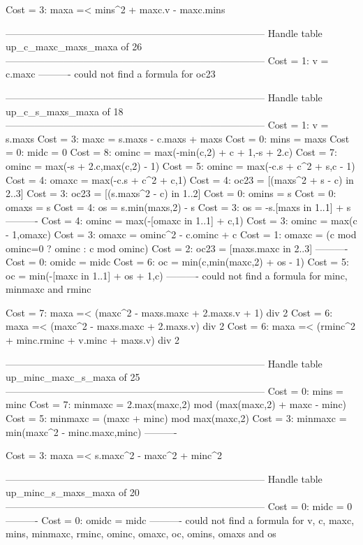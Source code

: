 Cost =  3:  maxa =< mins^2 + maxc.v - maxc.mins

--------------------------------------------------------------------------------
Handle table up_c_maxc_maxs_maxa of 26
--------------------------------------------------------------------------------
Cost =  1:  v    = c.maxc
----------
could not find a formula for oc23


--------------------------------------------------------------------------------
Handle table up_c_s_maxs_maxa of 18
--------------------------------------------------------------------------------
Cost =  1:  v       = s.maxs
Cost =  3:  maxc    = s.maxs - c.maxs + maxs
Cost =  0:  mins    = maxs
Cost =  0:  midc    = 0
Cost =  8:  ominc   = max(-min(c,2) + c + 1,-s + 2.c)
Cost =  7:  ominc   = max(-s + 2.c,max(c,2) - 1)
Cost =  5:  ominc   = max(-c.s + c^2 + s,c - 1)
Cost =  4:  omaxc   = max(-c.s + c^2 + c,1)
Cost =  4:  oc23    = [(maxs^2 + s - c) in 2..3]
Cost =  3:  oc23    = [(s.maxs^2 - c) in 1..2]
Cost =  0:  omins   = s
Cost =  0:  omaxs   = s
Cost =  4:  os      = s.min(maxs,2) - s
Cost =  3:  os      = -s.[maxs in 1..1] + s
----------
Cost =  4:  ominc   = max(-[omaxc in 1..1] + c,1)
Cost =  3:  ominc   = max(c - 1,omaxc)
Cost =  3:  omaxc   = ominc^2 - c.ominc + c
Cost =  1:  omaxc   = (c mod ominc=0 ? ominc : c mod ominc)
Cost =  2:  oc23    = [maxs.maxc in 2..3]
----------
Cost =  0:  omidc   = midc
Cost =  6:  oc      = min(c,min(maxc,2) + os - 1)
Cost =  5:  oc      = min(-[maxc in 1..1] + os + 1,c)
----------
could not find a formula for minc, minmaxc and rminc

Cost =  7:  maxa =< (maxc^2 - maxs.maxc + 2.maxs.v + 1) div 2
Cost =  6:  maxa =< (maxc^2 - maxs.maxc + 2.maxs.v) div 2
Cost =  6:  maxa =< (rminc^2 + minc.rminc + v.minc + maxs.v) div 2

--------------------------------------------------------------------------------
Handle table up_minc_maxc_s_maxa of 25
--------------------------------------------------------------------------------
Cost =  0:  mins    = minc
Cost =  7:  minmaxc = 2.max(maxc,2) mod (max(maxc,2) + maxc - minc)
Cost =  5:  minmaxc = (maxc + minc) mod max(maxc,2)
Cost =  3:  minmaxc = min(maxc^2 - minc.maxc,minc)
----------

Cost =  3:  maxa =< s.maxc^2 - maxc^2 + minc^2

--------------------------------------------------------------------------------
Handle table up_minc_s_maxs_maxa of 20
--------------------------------------------------------------------------------
Cost =  0:  midc    = 0
----------
Cost =  0:  omidc   = midc
----------
could not find a formula for v, c, maxc, mins, minmaxc, rminc, ominc, omaxc, oc, omins, omaxs and os


